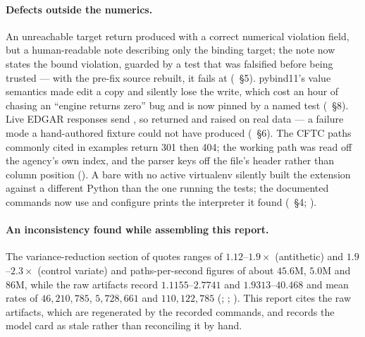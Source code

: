 \documentclass[11pt,a4paper]{article}
\begin{document}
\paragraph{Defects outside the numerics.} An unreachable target return produced
 with a correct numerical violation field, but a human-readable note
describing only the binding target; the note now states the bound violation, guarded by a test
that was falsified before being trusted --- with the pre-fix source rebuilt, it fails at
(~\S5). pybind11's value semantics
made  edit a copy and silently lose the write, which cost an hour
of chasing an ``engine returns zero'' bug and is now pinned by a named test
(~\S8). Live EDGAR responses send
, so  returned  and  raised
on real data --- a failure mode a hand-authored fixture could not have produced
(~\S6). The CFTC paths commonly cited in
examples return 301 then 404; the working path was read off the agency's own index, and the
parser keys off the file's header rather than column position
(). A bare  with no
active virtualenv silently built the extension against a different Python than the one running
the tests; the documented commands now use  and configure prints the
interpreter it found (~\S4;
).

\paragraph{An inconsistency found while assembling this report.} The variance-reduction
section of  quotes ranges of $1.12$--$1.9\times$
(antithetic) and $1.9$--$2.3\times$ (control variate) and paths-per-second figures of about
$45.6$M, $5.0$M and $86$M, while the raw artifacts record $1.1155$--$2.7741$ and
$1.9313$--$40.468$ and mean rates of $46{,}210{,}785$, $5{,}728{,}661$ and $110{,}122{,}785$ (;
;
). This report cites the raw artifacts, which
are regenerated by the recorded commands, and records the model card as stale rather than
reconciling it by hand. %
\end{document}
